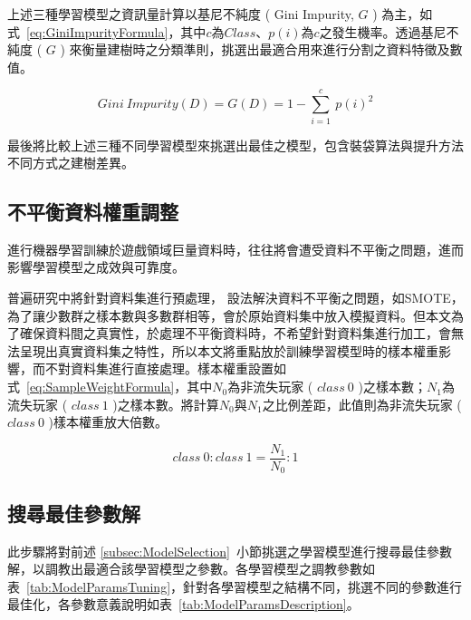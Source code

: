 上述三種學習模型之資訊量計算以基尼不純度 ( Gini Impurity, $G$ ) 為主，如式~\ref{eq:GiniImpurityFormula}，其中$c$為$Class$、$p(i)$為$c$之發生機率。透過基尼不純度 ( $G$ ) 來衡量建樹時之分類準則，挑選出最適合用來進行分割之資料特徵及數值。

\begin{equation}
  \label{eq:GiniImpurityFormula}
  Gini\ Impurity(D) = G(D) = 1 - \sum_{i = 1}^{c}\ p(i)^2
\end{equation}

最後將比較上述三種不同學習模型來挑選出最佳之模型，包含裝袋算法與提升方法不同方式之建樹差異。

\subsection{不平衡資料權重調整}
\label{subsec:ImbalancedDataHandle}

進行機器學習訓練於遊戲領域巨量資料時，往往將會遭受資料不平衡之問題，進而影響學習模型之成效與可靠度。

普遍研究中將針對資料集進行預處理， 設法解決資料不平衡之問題，如SMOTE，為了讓少數群之樣本數與多數群相等，會於原始資料集中放入模擬資料。但本文為了確保資料間之真實性，於處理不平衡資料時，不希望針對資料集進行加工，會無法呈現出真實資料集之特性，所以本文將重點放於訓練學習模型時的樣本權重影響，而不對資料集進行直接處理。樣本權重設置如式~\ref{eq:SampleWeightFormula}，其中$N_0$為非流失玩家 ( $class\ 0$ )之樣本數；$N_1$為流失玩家 ( $class\ 1$ )之樣本數。將計算$N_0$與$N_1$之比例差距，此值則為非流失玩家 ( $class\ 0$ )樣本權重放大倍數。

\begin{equation}
  \label{eq:SampleWeightFormula}
  class\ 0 : class\ 1 = \frac{N_1}{N_0} : 1
\end{equation}

\subsection{搜尋最佳參數解}
\label{subsec:TuningBestParams}

此步驟將對前述 \ref{subsec:ModelSelection}~小節挑選之學習模型進行搜尋最佳參數解，以調教出最適合該學習模型之參數。各學習模型之調教參數如表~\ref{tab:ModelParamsTuning}，針對各學習模型之結構不同，挑選不同的參數進行最佳化，各參數意義說明如表~\ref{tab:ModelParamsDescription}。

